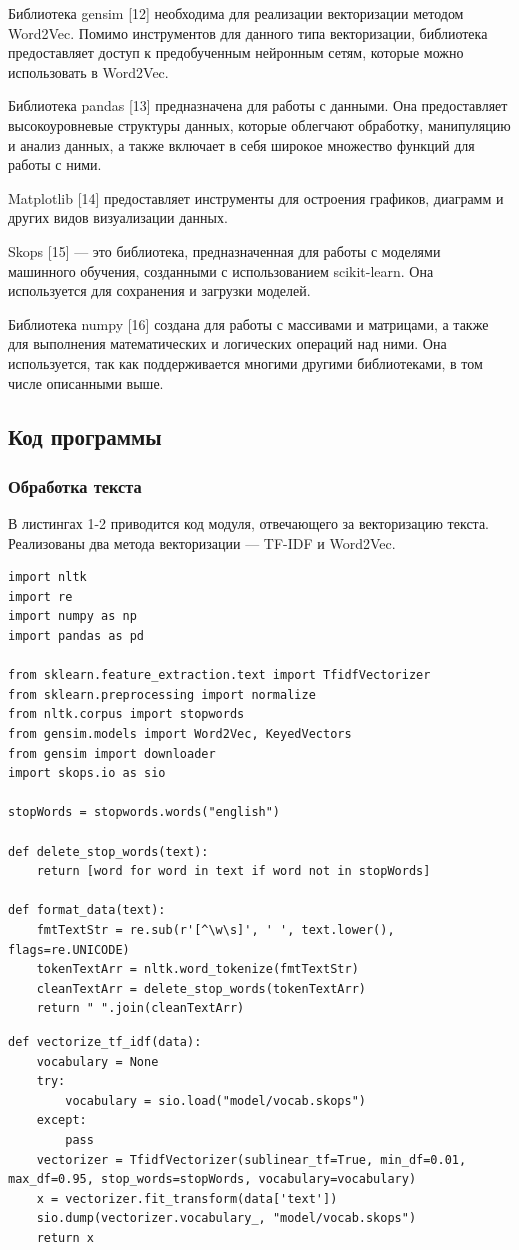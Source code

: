 \documentclass[a4paper, 12pt]{article}
\begin{document}
\begin{large}
Библиотека gensim [12] необходима для реализации векторизации методом Word2Vec. 
Помимо инструментов для данного типа векторизации, библиотека предоставляет доступ к предобученным нейронным сетям, которые можно использовать в Word2Vec.

Библиотека pandas [13] предназначена для работы с данными. 
Она предоставляет высокоуровневые структуры данных, которые облегчают обработку, манипуляцию и анализ данных, а также включает в себя широкое множество функций для работы с ними.

Matplotlib [14] предоставляет инструменты для остроения графиков, диаграмм и других видов визуализации данных.

Skops [15] --- это библиотека, предназначенная для работы с моделями машинного обучения, созданными с использованием scikit-learn. 
Она используется для сохранения и загрузки моделей.

Библиотека numpy [16] создана для работы с массивами и матрицами, а также для выполнения математических и логических операций над ними. 
Она используется, так как поддерживается многими другими библиотеками, в том числе описанными выше.

\subsection{Код программы}

\subsubsection{Обработка текста}
В листингах 1-2 приводится код модуля, отвечающего за векторизацию текста.
Реализованы два метода векторизации --- TF-IDF и Word2Vec.
\captionsetup{singlelinecheck=false, justification=raggedleft}
\begin{lstlisting}[caption={Модуль обработки текста}]
import nltk
import re
import numpy as np
import pandas as pd

from sklearn.feature_extraction.text import TfidfVectorizer
from sklearn.preprocessing import normalize
from nltk.corpus import stopwords
from gensim.models import Word2Vec, KeyedVectors
from gensim import downloader
import skops.io as sio

stopWords = stopwords.words("english")

def delete_stop_words(text):
    return [word for word in text if word not in stopWords]

def format_data(text):
    fmtTextStr = re.sub(r'[^\w\s]', ' ', text.lower(), flags=re.UNICODE)
    tokenTextArr = nltk.word_tokenize(fmtTextStr)
    cleanTextArr = delete_stop_words(tokenTextArr)
    return " ".join(cleanTextArr)
\end{lstlisting}
\begin{lstlisting}[caption={Модуль обработки текста}]
def vectorize_tf_idf(data):
    vocabulary = None
    try:
        vocabulary = sio.load("model/vocab.skops")
    except:
        pass
    vectorizer = TfidfVectorizer(sublinear_tf=True, min_df=0.01, max_df=0.95, stop_words=stopWords, vocabulary=vocabulary)
    x = vectorizer.fit_transform(data['text'])
    sio.dump(vectorizer.vocabulary_, "model/vocab.skops")
    return x


\end{lstlisting}
\end{large}
\end{document}
